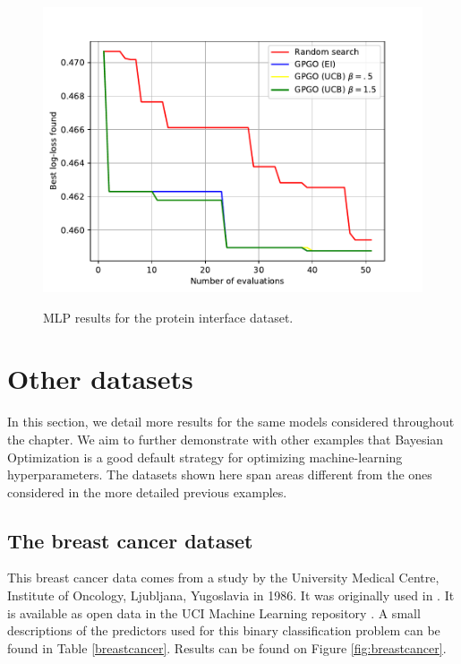 \documentclass[10pt,a4paper,twoside]{book}
\begin{document}
\begin{figure}
\centering
\caption{MLP results for the protein interface dataset.}
\includegraphics[scale=0.75]{figures/chapter4/pinter/mlp}
\label{fig:affmlp}
\end{figure}

\section{Other datasets}

In this section, we detail more results for the same models considered throughout the chapter. We aim to further demonstrate with other examples that Bayesian Optimization is a good default strategy for optimizing machine-learning hyperparameters. The datasets shown here span areas different from the ones considered in the more detailed previous examples.

\subsection{The breast cancer dataset}

This breast cancer data comes from a study by the University Medical Centre, Institute of Oncology, Ljubljana, Yugoslavia in 1986. It was originally used in \cite{Michalski1986}. It is available as open data in the UCI Machine Learning repository \cite{Lichman2013}. A small descriptions of the predictors used for this binary classification problem can be found in Table \ref{breastcancer}. Results can be found on Figure \ref{fig:breastcancer}.
\end{document}
